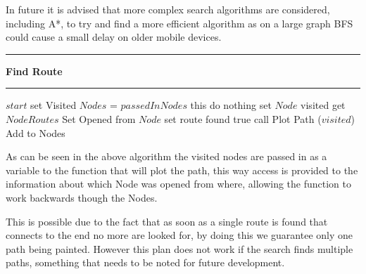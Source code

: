 In future it is advised that more complex search algorithms are considered, including A*, to try and find a more efficient algorithm as on a large graph BFS could cause a small delay on older mobile devices. 
\vspace{0.3cm}
\hrule
\vspace{0.1cm}
\textbf{Find Route}
\vspace{0.1cm}
\hrule
\vspace{0.1cm}
\begin{algorithmic}[1]
\State $start$ set Visited
\State $Nodes$ = $passedInNodes$
 this
    \State do nothing
\Else
	\State set $Node$ visited
    \State get $Node Routes$
    \State Set Opened from $Node$
    		\State set route found true
    		\State call Plot Path ($visited$)
    	\EndIf
    		\State Add to Nodes
    	\EndIf
    \EndFor
\EndIf
\EndFor
\EndWhile
\end{algorithmic}

As can be seen in the above algorithm the visited nodes are passed in as a variable to the function that will plot the path, this way access is provided to the information about which Node was opened from where, allowing the function to work backwards though the Nodes.

This is possible due to the fact that as soon as a single route is found that connects to the end no more are looked for, by doing this we guarantee only one path being painted. However this plan does not work if the search finds multiple paths, something that needs to be noted for future development. 

